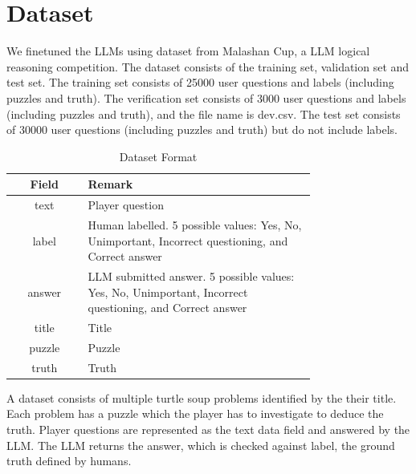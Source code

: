 \section{Dataset}
    We finetuned the LLMs using dataset from Malashan Cup, a LLM logical reasoning competition. The dataset consists of the training set, validation set and test set. The training set consists of 25000 user questions and labels (including puzzles and truth). The verification set consists of 3000 user questions and labels (including puzzles and truth), and the file name is dev.csv. The test set consists of 30000 user questions (including puzzles and truth) but do not include labels.
   
    \begin{table}
        \centering
        \begin{tabular}{|c|>{\centering\arraybackslash}p{0.75\linewidth}|} \hline 
             Field& Remark\\ \hline 
             text& Player question\\ \hline 
             label& Human labelled. 5 possible values: Yes, No, Unimportant, Incorrect questioning, and Correct answer\\ \hline 
             answer& LLM submitted answer. 5 possible values: Yes, No, Unimportant, Incorrect questioning, and Correct answer\\ \hline 
             title& Title\\ \hline 
             puzzle& Puzzle\\ \hline 
             truth& Truth\\ \hline
        \end{tabular}
\caption{Dataset Format}
\label{tab:my_table}

\end{table}

    A dataset consists of multiple turtle soup problems identified by the their title. Each problem has a puzzle which the player has to investigate to deduce the truth. Player questions are represented as the text data field and answered by the LLM. The LLM returns the answer, which is checked against label, the ground truth defined by humans.